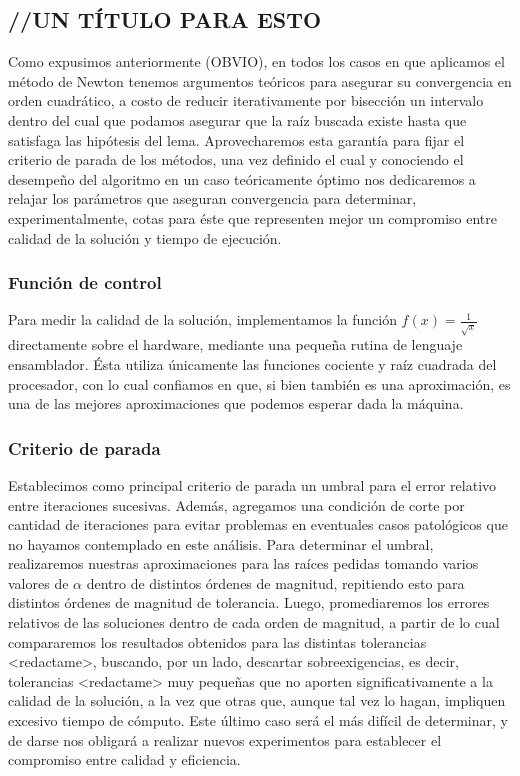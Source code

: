 \subsection{//UN TÍTULO PARA ESTO}
	
Como expusimos anteriormente (OBVIO), en todos los casos en que aplicamos el método de Newton tenemos argumentos teóricos para asegurar su convergencia en orden cuadrático, a costo de reducir iterativamente por bisección un intervalo dentro del cual que podamos asegurar que la raíz buscada existe hasta que satisfaga las hipótesis del lema. Aprovecharemos esta garantía para fijar el criterio de parada de los métodos, una vez definido el cual y conociendo el desempeño del algoritmo en un caso teóricamente óptimo nos dedicaremos a relajar los parámetros que aseguran convergencia para determinar, experimentalmente, cotas para éste que representen mejor un compromiso entre calidad de la solución y tiempo de ejecución.

	\subsubsection{Función de control}
Para medir la calidad de la solución, implementamos la función $f(x) = \frac{1}{\sqrt{x}}$ directamente sobre el hardware, mediante una pequeña rutina de lenguaje ensamblador. Ésta utiliza únicamente las funciones cociente y raíz cuadrada del procesador, con lo cual confiamos en que, si bien también es una aproximación, es una de las mejores aproximaciones que podemos esperar dada la máquina.

	\subsubsection{Criterio de parada}
Establecimos como principal criterio de parada un umbral para el error relativo entre iteraciones sucesivas. Además, agregamos una condición de corte por cantidad de iteraciones para evitar problemas en eventuales casos patológicos que no hayamos contemplado en este análisis. Para determinar el umbral, realizaremos nuestras aproximaciones para las raíces pedidas tomando varios valores de $\alpha$ dentro de distintos órdenes de magnitud, repitiendo esto para distintos órdenes de magnitud de tolerancia. Luego, promediaremos los errores relativos de las soluciones dentro de cada orden de magnitud, a partir de lo cual compararemos los resultados obtenidos para las distintas tolerancias <redactame>, buscando, por un lado, descartar sobreexigencias, es decir, tolerancias <redactame> muy pequeñas que no aporten significativamente a la calidad de la solución, a la vez que otras que, aunque tal vez lo hagan, impliquen excesivo tiempo de cómputo. Este último caso será el más difícil de determinar, y de darse nos 
obligará a realizar nuevos experimentos para establecer el compromiso entre calidad y eficiencia.

